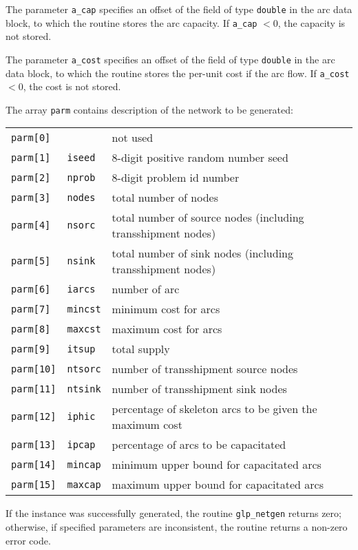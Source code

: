 \documentclass[11pt]{report}
\def\para#1{\noindent{\bf#1}}
\def\returns{\para{Returns}}
\begin{document}
The parameter \verb|a_cap| specifies an offset of the field of type
\verb|double| in the arc data block, to which the routine stores the
arc capacity. If \verb|a_cap| $<0$, the capacity is not stored.

The parameter \verb|a_cost| specifies an offset of the field of type
\verb|double| in the arc data block, to which the routine stores the
per-unit cost if the arc flow. If \verb|a_cost| $<0$, the cost is not
stored.

The array \verb|parm| contains description of the network to be
generated:

\begin{tabular}{@{}lll@{}}
\verb|parm[0] |&             &not used\\
\verb|parm[1] |&\verb|iseed |&8-digit positive random number seed\\
\verb|parm[2] |&\verb|nprob |&8-digit problem id number\\
\verb|parm[3] |&\verb|nodes |&total number of nodes\\
\verb|parm[4] |&\verb|nsorc |&total number of source nodes
(including transshipment nodes)\\
\verb|parm[5] |&\verb|nsink |&total number of sink nodes
(including transshipment nodes)\\
\verb|parm[6] |&\verb|iarcs |&number of arc\\
\verb|parm[7] |&\verb|mincst|&minimum cost for arcs\\
\verb|parm[8] |&\verb|maxcst|&maximum cost for arcs\\
\verb|parm[9] |&\verb|itsup |&total supply\\
\verb|parm[10]|&\verb|ntsorc|&number of transshipment source nodes\\
\verb|parm[11]|&\verb|ntsink|&number of transshipment sink nodes\\
\verb|parm[12]|&\verb|iphic |&percentage of skeleton arcs to be given
the maximum cost\\
\verb|parm[13]|&\verb|ipcap |&percentage of arcs to be capacitated\\
\verb|parm[14]|&\verb|mincap|&minimum upper bound for capacitated arcs\\
\verb|parm[15]|&\verb|maxcap|&maximum upper bound for capacitated arcs\\
\end{tabular}

\returns

If the instance was successfully generated, the routine
\verb|glp_netgen| returns zero; otherwise, if specified parameters are
inconsistent, the routine returns a non-zero error code.
\end{document}
